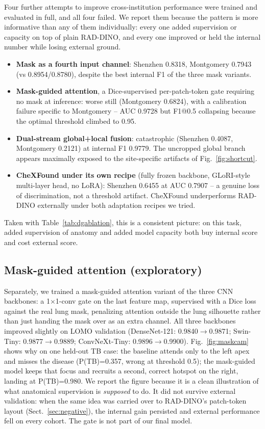 \documentclass[runningheads]{llncs}
\begin{document}
Four further attempts to improve cross-institution performance were trained
and evaluated in full, and all four failed. We report them because the
pattern is more informative than any of them individually: every one added
supervision or capacity on top of plain RAD-DINO, and every one improved or
held the internal number while losing external ground.

\begin{itemize}
\item \textbf{Mask as a fourth input channel}: Shenzhen 0.8318, Montgomery
  0.7943 (vs 0.8954/0.8780), despite the best internal F1 of the three
  mask variants.
\item \textbf{Mask-guided attention}, a Dice-supervised per-patch-token
  gate requiring no mask at inference: worse still (Montgomery 0.6824),
  with a calibration failure specific to Montgomery -- AUC 0.9728 but
  F1@0.5 collapsing because the optimal threshold climbed to 0.95.
\item \textbf{Dual-stream global+local fusion}: catastrophic (Shenzhen
  0.4087, Montgomery 0.2121) at internal F1 0.9779. The uncropped global
  branch appears maximally exposed to the site-specific artifacts of
  Fig.~\ref{fig:shortcut}.
\item \textbf{CheXFound under its own recipe} (fully frozen backbone,
  GLoRI-style multi-layer head, no LoRA): Shenzhen 0.6455 at AUC 0.7907 --
  a genuine loss of discrimination, not a threshold artifact. CheXFound
  underperforms RAD-DINO externally under both adaptation recipes we tried.
\end{itemize}

Taken with Table~\ref{tab:dgablation}, this is a consistent picture: on
this task, added supervision of anatomy and added model capacity both buy
internal score and cost external score.

\subsection{Mask-guided attention (exploratory)}

Separately, we trained a mask-guided attention variant of the three CNN
backbones: a 1$\times$1-conv gate on the last feature map, supervised with a
Dice loss against the real lung mask, penalizing attention outside the lung
silhouette rather than just handing the mask over as an extra channel. All
three backbones improved slightly on LOMO validation (DenseNet-121:
0.9840$\to$0.9871; Swin-Tiny: 0.9877$\to$0.9889; ConvNeXt-Tiny:
0.9896$\to$0.9900). Fig.~\ref{fig:maskcam} shows why on one held-out TB
case: the baseline attends only to the left apex and misses the disease
(P(TB)=0.357, wrong at threshold 0.5); the mask-guided model keeps that
focus and recruits a second, correct hotspot on the right, landing at
P(TB)=0.980. We report the figure because it is a clean illustration of
what anatomical supervision is \emph{supposed} to do. It did not survive
external validation: when the same idea was carried over to RAD-DINO's
patch-token layout (Sect.~\ref{sec:negative}), the internal gain persisted
and external performance fell on every cohort. The gate is not part of our
final model.
\end{document}
